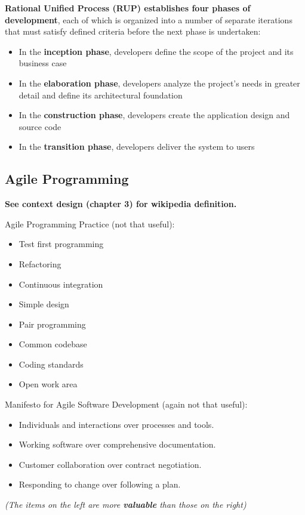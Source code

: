\documentclass[a4paper]{article}
\begin{document}
\textbf{Rational Unified Process (RUP) establishes four phases of development}, each of which is organized into a number of separate iterations that must satisfy defined criteria before the next phase is undertaken: 
\begin{itemize}
\item In the \textbf{inception phase}, developers define the scope of the project and its business case

\item In the \textbf{elaboration phase}, developers analyze the project's needs in greater detail and define its architectural foundation

\item In the \textbf{construction phase}, developers create the application design and source code

\item In the \textbf{transition phase}, developers deliver the system to users
\end{itemize}


\subsection{Agile Programming}

\textbf{See context design (chapter 3) for wikipedia definition.}

Agile Programming Practice (not that useful):
\begin{itemize}
\item Test first programming
\item Refactoring
\item Continuous integration
\item Simple design
\item Pair programming
\item Common codebase
\item Coding standards
\item Open work area\\
\end{itemize}

Manifesto for Agile Software Development (again not that useful):
\begin{itemize}
\item Individuals and interactions \quad over \quad processes and tools.
\item Working software \quad over \quad comprehensive documentation.
\item Customer collaboration \quad over \quad contract negotiation.
\item Responding to change \quad over \quad following a plan.
\end{itemize}
\textit{(The items on the left are more \textbf{valuable} than those on the right)}\\
\end{document}
